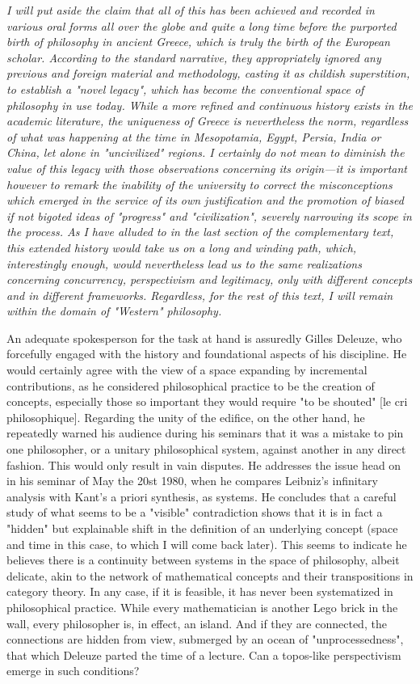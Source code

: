 \documentclass[11pt]{article}
\begin{document}
\emph{I will put aside the claim that all of this has been achieved and recorded in
various oral forms all over the globe and quite a long time before the purported birth
of philosophy in ancient Greece, which is truly the birth of the European scholar.
According to the standard narrative, they appropriately ignored any previous and foreign
material and methodology, casting it as childish superstition, to establish a "novel
legacy", which has become the conventional space of philosophy in use today. While a
more refined and continuous history exists in the academic literature, the uniqueness of
Greece is nevertheless the norm, regardless of what was happening at the time in
Mesopotamia, Egypt, Persia, India or China, let alone in "uncivilized" regions. I
certainly do not mean to diminish the value of this legacy with those observations
concerning its origin---it is important however to remark the inability of the
university to correct the misconceptions which emerged in the service of its own
justification and the promotion of biased if not bigoted ideas of "progress" and
"civilization", severely narrowing its scope in the process. As I have alluded to in the
last section of the complementary text, this extended history would take us on a long
and winding path, which, interestingly enough, would nevertheless lead us to the same
realizations concerning concurrency, perspectivism and legitimacy, only with different
concepts and in different frameworks. Regardless, for the rest of this text, I will
remain within the domain of "Western" philosophy.}

An adequate spokesperson for the task at hand is assuredly Gilles Deleuze, who
forcefully engaged with the history and foundational aspects of his discipline. He would
certainly agree with the view of a space expanding by incremental contributions, as he
considered philosophical practice to be the creation of concepts, especially those so
important they would require "to be shouted" [le cri philosophique]. Regarding the unity
of the edifice, on the other hand, he repeatedly warned his audience during his seminars
that it was a mistake to pin one philosopher, or a unitary philosophical system, against
another in any direct fashion. This would only result in vain disputes. He addresses the
issue head on in his seminar of May the 20st 1980, when he compares Leibniz's infinitary
analysis with Kant's a priori synthesis, as systems. He concludes that a careful study
of what seems to be a "visible" contradiction shows that it is in fact a "hidden" but
explainable shift in the definition of an underlying concept (space and time in this
case, to which I will come back later). This seems to indicate he believes there is a
continuity between systems in the space of philosophy, albeit delicate, akin to the
network of mathematical concepts and their transpositions in category theory. In any
case, if it is feasible, it has never been systematized in philosophical practice. While
every mathematician is another Lego brick in the wall, every philosopher is, in effect,
an island. And if they are connected, the connections are hidden from view, submerged by
an ocean of "unprocessedness", that which Deleuze parted the time of a lecture. Can a
topos-like perspectivism emerge in such conditions?
\end{document}
